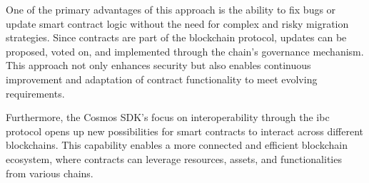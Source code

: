 One of the primary advantages of this approach is the ability to fix bugs or update smart contract logic without the need for complex and risky migration strategies. Since contracts are part of the blockchain protocol, updates can be proposed, voted on, and implemented through the chain's governance mechanism. This approach not only enhances security but also enables continuous improvement and adaptation of contract functionality to meet evolving requirements.

Furthermore, the Cosmos SDK's focus on interoperability through the \gls{ibc} protocol opens up new possibilities for smart contracts to interact across different blockchains. This capability enables a more connected and efficient blockchain ecosystem, where contracts can leverage resources, assets, and functionalities from various chains.

